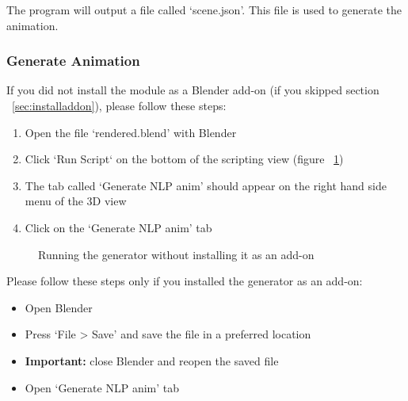 \noindent The program will output a file called `scene.json'. This file is used to generate the animation.

\subsubsection{Generate Animation}
\noindent If you did not install the module as a Blender add-on (if you skipped section ~\ref{sec:installaddon}), please follow these steps:
\begin{enumerate}
	\item Open the file `rendered.blend' with Blender
	\item Click `Run Script` on the bottom of the scripting view (figure ~\ref{fig:withoutaddon})
	\item The tab called `Generate NLP anim' should appear on the right hand side menu of the 3D view
	\item Click on the `Generate NLP anim' tab
\end{enumerate}

\begin{figure}[H]
	\centerline{}
	\caption{Running the generator without installing it as an add-on}\label{fig:withoutaddon}
\end{figure}

Please follow these steps only if you installed the generator as an add-on:
\begin{itemize}
	\item Open Blender
	\item Press `File > Save' and save the file in a preferred location
	\item \textbf{Important:} close Blender and reopen the saved file
	\item Open `Generate NLP anim' tab
\end{itemize}

